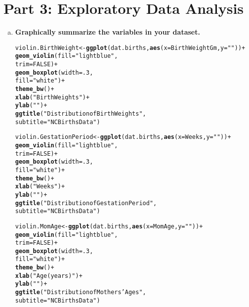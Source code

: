 \documentclass{article}\usepackage[]{graphicx}\usepackage[]{xcolor}
\makeatletter
\newcommand{\hlnum}[1]{\textcolor[rgb]{0.686,0.059,0.569}{#1}}%
\newcommand{\hlstr}[1]{\textcolor[rgb]{0.192,0.494,0.8}{#1}}%
\newcommand{\hlopt}[1]{\textcolor[rgb]{0,0,0}{#1}}%
\newcommand{\hlstd}[1]{\textcolor[rgb]{0.345,0.345,0.345}{#1}}%
\newcommand{\hlkwb}[1]{\textcolor[rgb]{0.69,0.353,0.396}{#1}}%
\newcommand{\hlkwc}[1]{\textcolor[rgb]{0.333,0.667,0.333}{#1}}%
\newcommand{\hlkwd}[1]{\textcolor[rgb]{0.737,0.353,0.396}{\textbf{#1}}}%
\newenvironment{kframe}{%
 \def\at@end@of@kframe{}%
 \ifinner\ifhmode%
  \def\at@end@of@kframe{\end{minipage}}%
  \begin{minipage}{\columnwidth}%
 \fi\fi%
 \def\FrameCommand##1{\hskip\@totalleftmargin \hskip-\fboxsep
 \colorbox{shadecolor}{##1}\hskip-\fboxsep
     \hskip-\linewidth \hskip-\@totalleftmargin \hskip\columnwidth}%
 \MakeFramed {\advance\hsize-\width
   \@totalleftmargin\z@ \linewidth\hsize
   \@setminipage}}%
 {\par\unskip\endMakeFramed%
 \at@end@of@kframe}
\newenvironment{knitrout}{}{} %
\makeatother
\begin{document}
\section{Part 3: Exploratory Data Analysis}
\begin{enumerate}[a.]
\item\textbf{Graphically summarize the variables in your dataset.}

\begin{knitrout}
\color{fgcolor}\begin{kframe}
\begin{alltt}
\hlstd{violin.BirthWeight} \hlkwb{<-} \hlkwd{ggplot}\hlstd{(dat.births,} \hlkwd{aes}\hlstd{(}\hlkwc{x}\hlstd{=BirthWeightGm,} \hlkwc{y}\hlstd{=}\hlstr{""}\hlstd{))}\hlopt{+}
  \hlkwd{geom_violin}\hlstd{(}\hlkwc{fill} \hlstd{=} \hlstr{"lightblue"}\hlstd{,}
              \hlkwc{trim} \hlstd{=} \hlnum{FALSE}\hlstd{)}\hlopt{+}
  \hlkwd{geom_boxplot}\hlstd{(}\hlkwc{width} \hlstd{=} \hlnum{.3}\hlstd{,}
               \hlkwc{fill} \hlstd{=} \hlstr{"white"}\hlstd{)} \hlopt{+}
  \hlkwd{theme_bw}\hlstd{()}\hlopt{+}
  \hlkwd{xlab}\hlstd{(}\hlstr{"Birth Weights"}\hlstd{)}\hlopt{+}
  \hlkwd{ylab}\hlstd{(}\hlstr{" "}\hlstd{)}\hlopt{+}
  \hlkwd{ggtitle}\hlstd{(}\hlstr{"Distribution of Birth Weights"}\hlstd{,}
          \hlkwc{subtitle} \hlstd{=} \hlstr{"NCBirths Data"}\hlstd{)}


\hlstd{violin.GestationPeriod} \hlkwb{<-} \hlkwd{ggplot}\hlstd{(dat.births,} \hlkwd{aes}\hlstd{(}\hlkwc{x}\hlstd{=Weeks,} \hlkwc{y}\hlstd{=}\hlstr{""}\hlstd{))}\hlopt{+}
  \hlkwd{geom_violin}\hlstd{(}\hlkwc{fill} \hlstd{=} \hlstr{"lightblue"}\hlstd{,}
              \hlkwc{trim} \hlstd{=} \hlnum{FALSE}\hlstd{)}\hlopt{+}
  \hlkwd{geom_boxplot}\hlstd{(}\hlkwc{width} \hlstd{=} \hlnum{.3}\hlstd{,}
               \hlkwc{fill} \hlstd{=} \hlstr{"white"}\hlstd{)} \hlopt{+}
  \hlkwd{theme_bw}\hlstd{()}\hlopt{+}
  \hlkwd{xlab}\hlstd{(}\hlstr{"Weeks"}\hlstd{)}\hlopt{+}
  \hlkwd{ylab}\hlstd{(}\hlstr{" "}\hlstd{)}\hlopt{+}
  \hlkwd{ggtitle}\hlstd{(}\hlstr{"Distribution of Gestation Period"}\hlstd{,}
          \hlkwc{subtitle} \hlstd{=} \hlstr{"NCBirths Data"}\hlstd{)}


\hlstd{violin.MomAge} \hlkwb{<-} \hlkwd{ggplot}\hlstd{(dat.births,} \hlkwd{aes}\hlstd{(}\hlkwc{x}\hlstd{=MomAge,} \hlkwc{y}\hlstd{=}\hlstr{""}\hlstd{))}\hlopt{+}
  \hlkwd{geom_violin}\hlstd{(}\hlkwc{fill} \hlstd{=} \hlstr{"lightblue"}\hlstd{,}
              \hlkwc{trim} \hlstd{=} \hlnum{FALSE}\hlstd{)}\hlopt{+}
  \hlkwd{geom_boxplot}\hlstd{(}\hlkwc{width} \hlstd{=} \hlnum{.3}\hlstd{,}
               \hlkwc{fill} \hlstd{=} \hlstr{"white"}\hlstd{)} \hlopt{+}
  \hlkwd{theme_bw}\hlstd{()}\hlopt{+}
  \hlkwd{xlab}\hlstd{(}\hlstr{"Age (years)"}\hlstd{)}\hlopt{+}
  \hlkwd{ylab}\hlstd{(}\hlstr{" "}\hlstd{)}\hlopt{+}
  \hlkwd{ggtitle}\hlstd{(}\hlstr{"Distribution of Mothers' Ages"}\hlstd{,}
          \hlkwc{subtitle} \hlstd{=} \hlstr{"NCBirths Data"}\hlstd{)}


\end{alltt}
\end{kframe}
\end{knitrout}
\end{enumerate}
\end{document}
